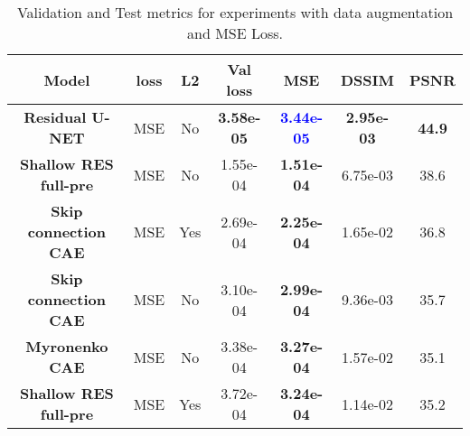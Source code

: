 \iffalse
\begin{table}[!ht]
  \begin{center}
   \setlength\extrarowheight{2pt} %
   \begin{tabular}{>{\bf}c c c | c | >{\bf}c c c}
    \toprule
    Model & \textbf{loss}  & \textbf{L2}  & \textbf{Val loss}  & \textbf{MSE}   & \textbf{DSSIM} & \textbf{PSNR} \\
    \hline   
    Residual U-NET        & MSE & No  & \textbf{3.58e-05}  & \textcolor{blue}{3.44e-05}   & \textbf{2.95e-03}	& \textbf{44.9}\\
    Shallow RES full-pre  & MSE & No  & 1.55e-04           & 1.51e-04	                    & 6.75e-03	            & 38.6\\
    Skip connection CAE   & MSE & Yes & 2.69e-04           & 2.25e-04	                    & 1.65e-02	            & 36.8\\
    Skip connection CAE   & MSE & No  & 3.10e-04           & 2.99e-04	                    & 9.36e-03	            & 35.7\\
    Myronenko CAE         & MSE & No  & 3.38e-04           & 3.27e-04	                    & 1.57e-02	            & 35.1\\
    Shallow RES full-pre  & MSE & Yes & 3.72e-04           & 3.24e-04	                    & 1.14e-02	            & 35.2\\
    \bottomrule
    \end{tabular}
    \end{center}
    \caption{Validation and Test metrics for experiments with data augmentation and MSE Loss.}
    \label{table:expaugMSE}
\end{table}


